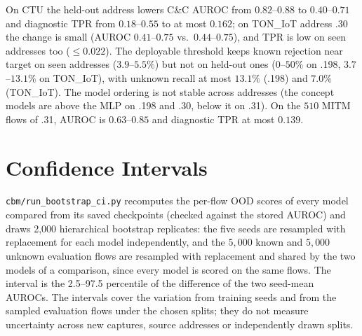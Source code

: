 \documentclass[journal]{IEEEtran}
\begin{document}
On CTU the held-out address lowers C\&C AUROC from $0.82$--$0.88$ to $0.40$--$0.71$ and diagnostic
TPR from $0.18$--$0.55$ to at most $0.162$; on TON\_IoT address .30 the change is small (AUROC
$0.41$--$0.75$ vs.\ $0.44$--$0.75$), and TPR is low on seen addresses too ($\le0.022$). The deployable
threshold keeps known rejection near target on seen addresses ($3.9$--$5.5\%$) but not on held-out
ones ($0$--$50\%$ on .198, $3.7$--$13.1\%$ on TON\_IoT), with unknown recall at most $13.1\%$ (.198) and
$7.0\%$ (TON\_IoT). The model ordering is not stable across addresses (the concept models are above
the MLP on .198 and .30, below it on .31). On the $510$ MITM flows of .31, AUROC is $0.63$--$0.85$
and diagnostic TPR at most $0.139$.

\section{Confidence Intervals}
\label{sec:ci}
\texttt{cbm/run\_bootstrap\_ci.py} recomputes the per-flow OOD scores of every model compared from its saved
checkpoints (checked against the stored AUROC) and draws 2{,}000 hierarchical bootstrap replicates:
the five seeds are resampled with replacement for each model independently, and the $5{,}000$ known
and $5{,}000$ unknown evaluation flows are resampled with replacement and shared by the two models
of a comparison, since every model is scored on the same flows. The interval is the 2.5--97.5
percentile of the difference of the two seed-mean AUROCs. The intervals cover the variation from
training seeds and from the sampled evaluation flows under the chosen splits; they do not measure
uncertainty across new captures, source addresses or independently drawn splits.
\end{document}
